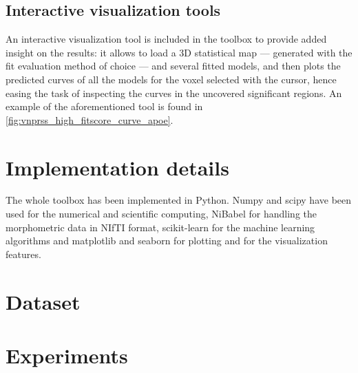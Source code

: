 \documentclass{article}
\begin{document}
\subsection{Interactive visualization tools}

An interactive visualization tool is included in the toolbox to provide added insight on the results: it allows to load a 3D statistical map — generated with the fit evaluation method of choice — and several fitted models, and then plots the predicted curves of all the models for the voxel selected with the cursor, hence easing the task of inspecting the curves in the uncovered significant regions. An example of the aforementioned tool is found in \autoref{fig:vnprss_high_fitscore_curve_apoe}. 

\section{Implementation details}

The whole toolbox has been implemented in Python. Numpy and scipy have been used for the numerical and scientific computing, NiBabel for handling the morphometric data in NIfTI format, scikit-learn for the machine learning algorithms and matplotlib and seaborn for plotting and for the visualization features.

\section{Dataset}

\section{Experiments}
\end{document}
